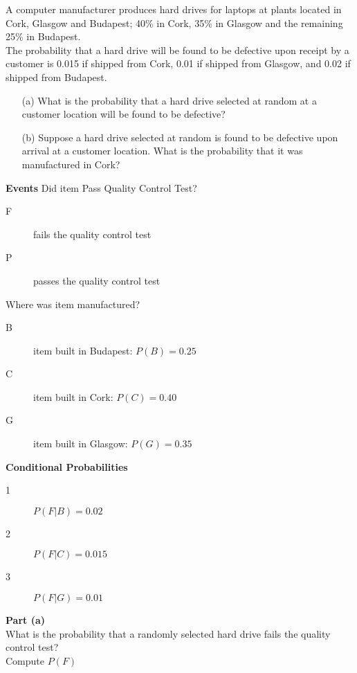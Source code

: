 \documentclass[a4paper,12pt]{article}
\begin{document}
\large 
\noindent A computer manufacturer produces hard drives for laptops at plants located in Cork, Glasgow and Budapest; 40\% in Cork, 35\% in Glasgow and the remaining 25\% in Budapest.\\

\noindent The probability that a hard drive will be found to be defective upon receipt by a customer is 0.015 if shipped from Cork, 0.01 if shipped from Glasgow, and 0.02 if shipped from Budapest.

\begin{itemize}
\item[(a)]What is the probability that a hard drive selected at random at a customer location will be found to be defective?
\item[(b)]Suppose a hard drive selected at random is found to be defective upon arrival at a customer location. What is the probability that it was manufactured in Cork?
\end{itemize}


\begin{framed}
\noindent \textbf{Events}
Did item Pass Quality Control Test?
\begin{description}
\item[F] fails the quality control test
\item[P] passes the quality control test
\end{description}
\medskip
Where was item manufactured?

\begin{description}
\item[B] item built in Budapest: $P(B) = 0.25$
\item[C] item built in Cork:  $P(C) = 0.40$
\item[G] item built in Glasgow: $P(G) = 0.35$
\end{description}

\end{framed}

\begin{framed}
\noindent \textbf{Conditional Probabilities}
\begin{multicols}{2}
\begin{description}
\item[1] $P(F|B) = 0.02$
\item[2] $P(F|C) = 0.015$
\item[3] $P(F|G) = 0.01$
\end{description}
\end{multicols}
\end{framed}
\newpage 
\noindent \textbf{Part (a)}\\
What is the probability that a randomly selected hard drive fails the quality control test?\\
\medskip
\noindent Compute $P(F)$ 
\end{document}
